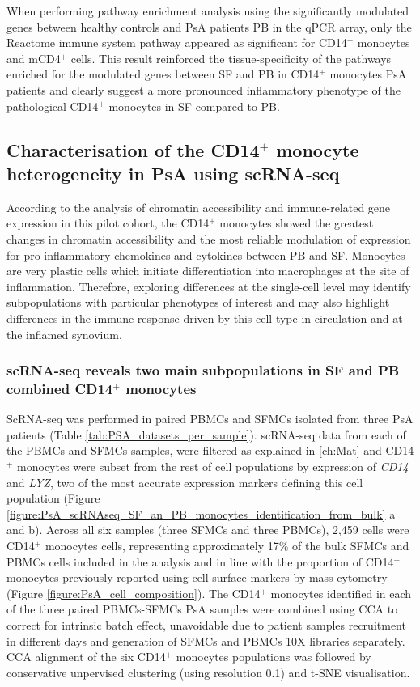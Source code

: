 When performing pathway enrichment analysis using the significantly modulated genes between healthy controls and PsA patients PB in the qPCR array, only the Reactome immune system pathway appeared as significant for CD14$^+$ monocytes and mCD4$^+$ cells. This result reinforced the tissue-specificity of the pathways enriched for the modulated genes between SF and PB in CD14$^+$ monocytes PsA patients and clearly suggest a more pronounced inflammatory phenotype of the pathological CD14$^+$ monocytes in SF compared to PB.



\subsection{Characterisation of the CD14$^+$ monocyte heterogeneity in PsA using scRNA-seq}
According to the analysis of chromatin accessibility and immune-related gene expression in this pilot cohort, the CD14$^+$ monocytes showed the greatest changes in chromatin accessibility and the most reliable modulation of expression for pro-inflammatory chemokines and cytokines between PB and SF. Monocytes are very plastic cells which initiate differentiation into macrophages at the site of inflammation. Therefore, exploring differences at the single-cell level may identify subpopulations with particular phenotypes of interest and may also highlight differences in the immune response driven by this cell type in circulation and at the inflamed synovium.


\subsubsection{scRNA-seq reveals two main subpopulations in SF and PB combined CD14$^+$ monocytes}
ScRNA-seq was performed in paired PBMCs and SFMCs isolated from three PsA patients (Table \ref{tab:PSA_datasets_per_sample}). scRNA-seq data from each of the PBMCs and SFMCs samples, were filtered as explained in \ref{ch:Mat} and CD14$^+$ monocytes were subset from the rest of cell populations by expression of \textit{CD14} and \textit{LYZ}, two of the most accurate expression markers defining this cell population (Figure \ref{figure:PsA_scRNAseq_SF_an_PB_monocytes_identification_from_bulk} a and b). Across all six samples (three SFMCs and three PBMCs), 2,459 cells were CD14$^+$ monocytes cells, representing approximately 17\% of the bulk SFMCs and PBMCs cells included in the analysis and in line with the proportion of CD14$^+$ monocytes previously reported using cell surface markers by mass cytometry  (Figure \ref{figure:PsA_cell_composition}). The CD14$^+$ monocytes identified in each of the three  paired PBMCs-SFMCs PsA samples were combined using CCA to correct for intrinsic batch effect, unavoidable due to patient samples recruitment in different days and generation of SFMCs and PBMCs 10X libraries separately. CCA alignment of the six CD14$^+$ monocytes populations was followed by conservative unpervised clustering (using resolution 0.1) and t-SNE visualisation. 

